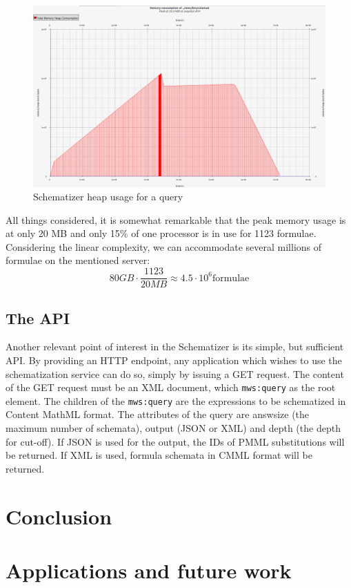 \documentclass[a4paper,11pt,oneside]{article}
\def\cmml{\textsf{Content MathML}\xspace}
\def\xml{\textsf{XML}\xspace}
\begin{document}
\begin{figure}[ht]\centering
    \includegraphics[width=12.8cm]{img/heapUsage.png}
    \caption{Schematizer heap usage for a query}\label{fig:heap_usage}
\end{figure}

All things considered, it is somewhat remarkable that the peak memory usage
is at only 20 MB and only 15\% of one processor is in use for 1123 formulae.
Considering the linear complexity, we can accommodate several millions of
formulae on the mentioned server:
$$80 GB \cdot \frac{1123}{20 MB} \approx 4.5 \cdot {10}^{6} \text{formulae}$$

\subsection{The API}\label{subsec:schematizer_api}
Another relevant point of interest in the Schematizer is its simple, but
sufficient API. By providing an HTTP endpoint, any application which wishes to
use the schematization service can do so, simply by issuing a GET request.
The content of the GET request must be an \xml document, which \verb|mws:query|
as the root element. The children of the \verb|mws:query| are the expressions
to be schematized in \cmml format. The attributes of the query are
\textsf{answsize} (the maximum number of schemata), \textsf{output} (JSON or
XML) and \textsf{depth} (the depth for cut-off).  If JSON is used for the
output, the IDs of PMML substitutions will be returned. If XML is used, formula
schemata in CMML format will be returned.

\section{Conclusion}\label{sec:conclusion}

\section{Applications and future work}\label{sec:future}

\printbibliography
\end{document}
